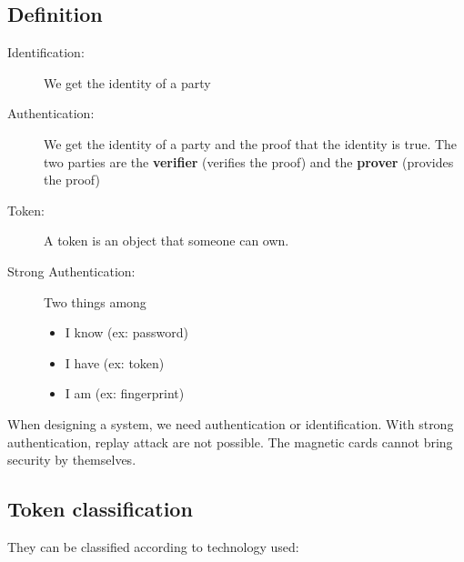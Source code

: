 
\subsection{Definition}

\begin{description}
    \item[Identification:] We get the identity of a party
    \item[Authentication:] We get the identity of a party and the proof that the
        identity is true. The two parties are the \textbf{verifier}
        (verifies the proof) and the \textbf{prover} (provides the proof)
    \item[Token:] A token is an object that someone can own.
    \item[Strong Authentication: ] Two things among 
    \begin{itemize}
    		\item I know (ex: password)
    		\item I have (ex: token)
    		\item I am (ex: fingerprint)
    \end{itemize}
\end{description}

When designing a system, we need authentication or identification. With strong
authentication, replay attack are not possible.
The magnetic cards cannot bring security by themselves.

\subsection{Token classification}
They can be classified according to technology used:

